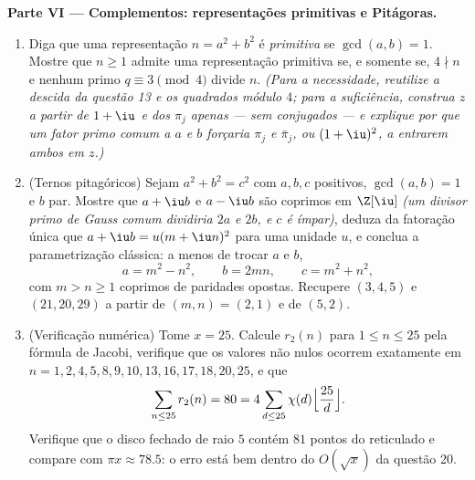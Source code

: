 \begin{problem}
\medskip
\noindent\textbf{Parte VI --- Complementos: representações primitivas e
Pitágoras.}
\begin{enumerate}[resume]
  \item Diga que uma representação $n = a^2 + b^2$ é \emph{primitiva} se $\gcd(a, b) = 1$.
        Mostre que $n \geq 1$ admite uma representação primitiva se, e
        somente se, $4 \nmid n$ e nenhum primo $q \equiv 3 \pmod 4$ divide $n$.
        \emph{(Para a necessidade, reutilize a descida da questão 13 e
        os quadrados módulo $4$; para a suficiência, construa
        $z$ a partir de $1 + \iu$ e dos $\pi_j$ apenas --- sem
        conjugados --- e explique por que um fator primo comum a
        $a$ e $b$ forçaria $\pi_j$ e $\bar\pi_j$, ou $(1+\iu)^2$, a
        entrarem ambos em $z$.)}
  \item (Ternos pitagóricos) Sejam $a^2 + b^2 = c^2$ com $a, b,
        c$ positivos, $\gcd(a, b) = 1$ e
        $b$ par. Mostre que $a + \iu b$ e $a - \iu b$ são coprimos em $\Z[\iu]$
        \emph{(um divisor primo de Gauss comum dividiria $2a$ e
        $2b$, e $c$ é ímpar)}, deduza da fatoração única que
        $a + \iu b = u(m + \iu n)^2$ para uma unidade $u$, e conclua a parametrização
        clássica: a menos de trocar $a$ e $b$,
        \[
        a = m^2 - n^2, \qquad b = 2mn, \qquad c = m^2 + n^2,
        \]
        com $m > n \geq 1$ coprimos de paridades opostas. Recupere $(3, 4, 5)$ e $(21, 20, 29)$
        a partir de $(m, n) =
        (2, 1)$ e de $(5, 2)$.
  \item (Verificação numérica) Tome $x = 25$. Calcule $r_2(n)$
        para $1 \leq n \leq 25$ pela fórmula de Jacobi, verifique que os valores não
        nulos ocorrem exatamente em $n = 1,
        2, 4, 5, 8, 9, 10, 13, 16, 17, 18, 20, 25$, e que
        \[
        \sum_{n \leq 25} r_2(n) = 80
        = 4\sum_{d \leq 25}\chi(d)
        \Bigl\lfloor\frac{25}d\Bigr\rfloor .
        \]
        Verifique que o disco fechado de raio $5$ contém $81$
        pontos do reticulado e compare com $\pi x \approx 78.5$: o erro está bem
        dentro do $O(\sqrt x)$ da questão 20.
\end{enumerate}
\end{problem}
